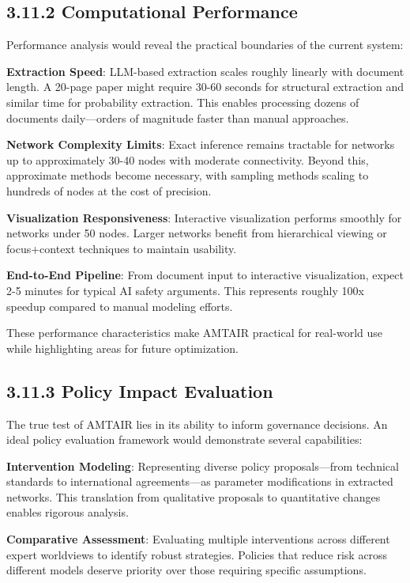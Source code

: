 \documentclass[
  11pt,
  letterpaper,
]{book}
\begin{document}
\subsection{3.11.2 Computational
Performance}\label{sec-computational-performance}

Performance analysis would reveal the practical boundaries of the
current system:

\textbf{Extraction Speed}: LLM-based extraction scales roughly linearly
with document length. A 20-page paper might require 30-60 seconds for
structural extraction and similar time for probability extraction. This
enables processing dozens of documents daily---orders of magnitude
faster than manual approaches.

\textbf{Network Complexity Limits}: Exact inference remains tractable
for networks up to approximately 30-40 nodes with moderate connectivity.
Beyond this, approximate methods become necessary, with sampling methods
scaling to hundreds of nodes at the cost of precision.

\textbf{Visualization Responsiveness}: Interactive visualization
performs smoothly for networks under 50 nodes. Larger networks benefit
from hierarchical viewing or focus+context techniques to maintain
usability.

\textbf{End-to-End Pipeline}: From document input to interactive
visualization, expect 2-5 minutes for typical AI safety arguments. This
represents roughly 100x speedup compared to manual modeling efforts.

These performance characteristics make AMTAIR practical for real-world
use while highlighting areas for future optimization.

\subsection{3.11.3 Policy Impact Evaluation}\label{sec-policy-impact}

The true test of AMTAIR lies in its ability to inform governance
decisions. An ideal policy evaluation framework would demonstrate
several capabilities:

\textbf{Intervention Modeling}: Representing diverse policy
proposals---from technical standards to international agreements---as
parameter modifications in extracted networks. This translation from
qualitative proposals to quantitative changes enables rigorous analysis.

\textbf{Comparative Assessment}: Evaluating multiple interventions
across different expert worldviews to identify robust strategies.
Policies that reduce risk across different models deserve priority over
those requiring specific assumptions.
\end{document}
